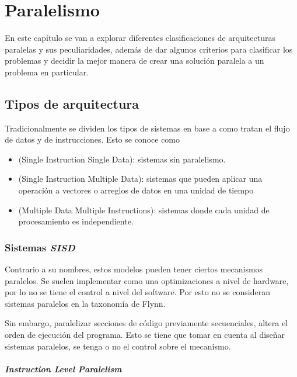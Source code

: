\chapter{Paralelismo}
\label{cap:paralelism}

En este capítulo se van a explorar diferentes clasificaciones de arquitecturas
paralelas y sus peculiaridades, además de dar algunos criterios para clasificar
los problemas y decidir la mejor manera de crear una solución paralela a un
problema en particular.

\section{Tipos de arquitectura}

Tradicionalmente se dividen los tipos de sistemas en base a como tratan el
flujo de datos y de instrucciones. Esto se conoce como 

\begin{itemize}
  \item {} (Single Instruction Single Data): sistemas sin paralelismo.

  \item {} (Single Instruction Multiple Data):
    sistemas que pueden aplicar una operación a vectores o arreglos de datos en
    una unidad de tiempo

  \item {} (Multiple Data Multiple Instructions):
    sistemas donde cada unidad de procesamiento es independiente.
\end{itemize}

\subsection{Sistemas \textit{SISD}}

Contrario a su nombres, estos modelos pueden tener ciertos mecanismos
paralelos. Se suelen implementar como una optimizaciones a nivel de hardware,
por lo no se tiene el control a nivel del software. Por esto no se consideran
sistemas paralelos en la taxonomía de Flynn.

Sin embargo, paralelizar secciones de código previamente secuenciales, altera
el orden de ejecución del programa. Esto se tiene que tomar en cuenta al
diseñar sistemas paralelos, se tenga o no el control sobre el mecanismo.

\subsubsection{\emph{Instruction Level Paralelism}}

